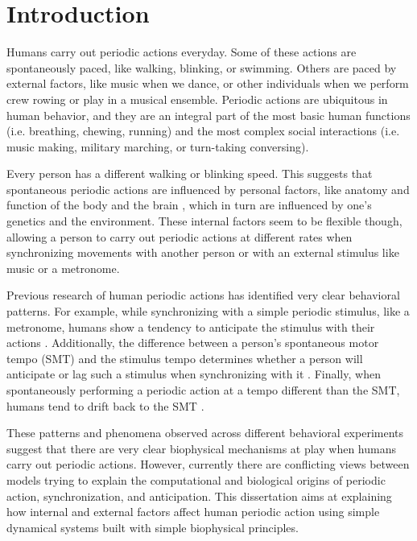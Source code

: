 \documentclass{report}
\begin{document}
\chapter{Introduction}

Humans carry out periodic actions everyday. Some of these actions are spontaneously paced, like walking, blinking, or swimming. Others are paced by external factors, like music when we dance, or other individuals when we perform crew rowing or play in a musical ensemble. Periodic actions are ubiquitous in human behavior, and they are an integral part of the most basic human functions (i.e. breathing, chewing, running) and the most complex social interactions (i.e. music making, military marching, or turn-taking conversing).

Every person has a different walking or blinking speed. This suggests that spontaneous periodic actions are influenced by personal factors, like anatomy and function of the body \cite{goodman2000advantages} and the brain \cite{latash1992virtual}, which in turn are influenced by one’s genetics and the environment. These internal factors seem to be flexible though, allowing a person to carry out periodic actions at different rates when synchronizing movements with another person or with an external stimulus like music or a metronome. 

Previous research of human periodic actions has identified very clear behavioral patterns. For example, while synchronizing with a simple periodic stimulus, like a metronome, humans show a tendency to anticipate the stimulus with their actions \cite{repp2007tapping}. Additionally, the difference between a person’s spontaneous motor tempo (SMT) and the stimulus tempo determines whether a person will anticipate or lag such a stimulus when synchronizing with it \cite{scheurich2018tapping}. Finally, when spontaneously performing a periodic action at a tempo different than the SMT, humans tend to drift back to the SMT \cite{zamm2018musicians}. 

These patterns and phenomena observed across different behavioral experiments suggest that there are very clear biophysical mechanisms at play when humans carry out periodic actions. However, currently there are conflicting views between models trying to explain the computational and biological origins of periodic action, synchronization, and anticipation. This dissertation aims at explaining how internal and external factors affect human periodic action using simple dynamical systems built with simple biophysical principles. 
\end{document}

